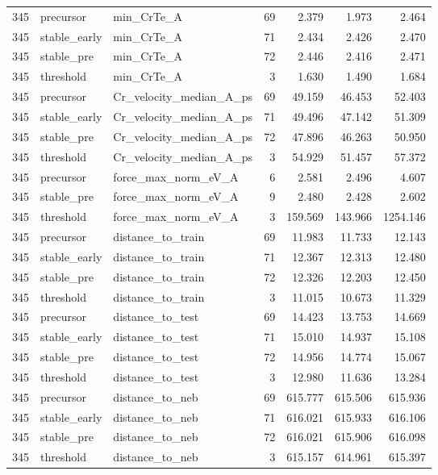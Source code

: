 \begin{tabular}{lllrrrr}
345 & precursor & min_CrTe_A & 69 & 2.379 & 1.973 & 2.464 \\
345 & stable_early & min_CrTe_A & 71 & 2.434 & 2.426 & 2.470 \\
345 & stable_pre & min_CrTe_A & 72 & 2.446 & 2.416 & 2.471 \\
345 & threshold & min_CrTe_A & 3 & 1.630 & 1.490 & 1.684 \\
345 & precursor & Cr_velocity_median_A_ps & 69 & 49.159 & 46.453 & 52.403 \\
345 & stable_early & Cr_velocity_median_A_ps & 71 & 49.496 & 47.142 & 51.309 \\
345 & stable_pre & Cr_velocity_median_A_ps & 72 & 47.896 & 46.263 & 50.950 \\
345 & threshold & Cr_velocity_median_A_ps & 3 & 54.929 & 51.457 & 57.372 \\
345 & precursor & force_max_norm_eV_A & 6 & 2.581 & 2.496 & 4.607 \\
345 & stable_pre & force_max_norm_eV_A & 9 & 2.480 & 2.428 & 2.602 \\
345 & threshold & force_max_norm_eV_A & 3 & 159.569 & 143.966 & 1254.146 \\
345 & precursor & distance_to_train & 69 & 11.983 & 11.733 & 12.143 \\
345 & stable_early & distance_to_train & 71 & 12.367 & 12.313 & 12.480 \\
345 & stable_pre & distance_to_train & 72 & 12.326 & 12.203 & 12.450 \\
345 & threshold & distance_to_train & 3 & 11.015 & 10.673 & 11.329 \\
345 & precursor & distance_to_test & 69 & 14.423 & 13.753 & 14.669 \\
345 & stable_early & distance_to_test & 71 & 15.010 & 14.937 & 15.108 \\
345 & stable_pre & distance_to_test & 72 & 14.956 & 14.774 & 15.067 \\
345 & threshold & distance_to_test & 3 & 12.980 & 11.636 & 13.284 \\
345 & precursor & distance_to_neb & 69 & 615.777 & 615.506 & 615.936 \\
345 & stable_early & distance_to_neb & 71 & 616.021 & 615.933 & 616.106 \\
345 & stable_pre & distance_to_neb & 72 & 616.021 & 615.906 & 616.098 \\
345 & threshold & distance_to_neb & 3 & 615.157 & 614.961 & 615.397 \\
\end{tabular}

